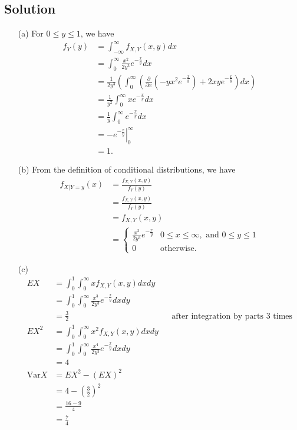 \documentclass[10pt,a4paper]{article}
\theoremstyle{theorem}
\theoremstyle{definition}
\begin{document}
\subsection*{Solution}
\begin{enumerate}
\item[(a)] For $0 \leq y \leq 1$, we have
\begin{align*}
f_Y(y) &= \int_{-\infty}^{\infty} f_{X, Y}(x, y) dx\\
&= \int_{0}^{\infty} \frac{x^2}{2 y^3} e^{- \frac{x}{y}} dx\\
&= \frac{1}{2 y^3} \left( \int_{0}^{\infty} \left(\frac{\partial}{\partial x} (-yx^2 e^{- \frac{x}{y}}) + 2xy e^{- \frac{x}{y}}\right) dx \right)\\
&= \frac{1}{y^2} \int_{0}^{\infty} x e^{- \frac{x}{y}} dx\\
&= \frac{1}{y} \int_{0}^{\infty} e^{- \frac{x}{y}} dx\\
&= \left. - e^{- \frac{x}{y}} \right|_{0}^\infty\\
&= 1.
\end{align*}

\item[(b)] From the definition of conditional distributions, we have
\begin{align*}
f_{X|Y = y}(x) &= \frac{f_{X, Y}(x, y)}{f_Y(y)}\\
&= \frac{f_{X, Y}(x, y)}{f_Y(y)}\\
&= f_{X, Y}(x, y)\\
&= \begin{cases} 
      \frac{x^2}{2 y^3} e^{- \frac{x}{y}} & 0 \leq x \leq \infty, \text{ and } 0 \leq y \leq 1 \\
      0 & \text{otherwise.}
   \end{cases}
\end{align*}

\item[(c)] 
\begin{align*}
EX &= \int_0^1 \int_0^\infty x f_{X, Y}(x, y) dx dy\\
&= \int_0^1 \int_0^\infty \frac{x^3}{2 y^3} e^{- \frac{x}{y}} dx dy\\
&= \frac{3}{2} && \text{after integration by parts 3 times}\\
EX^2 &= \int_0^1 \int_0^\infty x^2 f_{X, Y}(x, y) dx dy\\
&= \int_0^1 \int_0^\infty \frac{x^4}{2 y^3} e^{- \frac{x}{y}} dx dy\\ 
&= 4\\
\text{Var}X &= EX^2 - (EX)^2\\
&= 4 - (\frac{3}{2})^2\\
&= \frac{16 - 9}{4}\\
&= \frac{7}{4}
\end{align*}
\end{enumerate}
\end{document}
